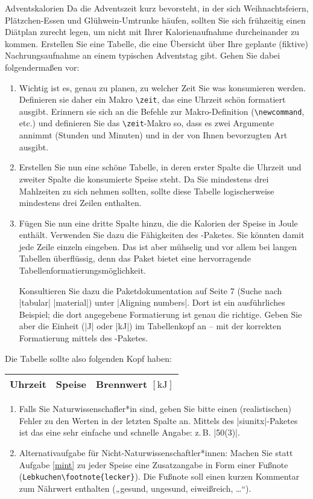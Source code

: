 \documentclass[
	vorläufig=true, 
	blattnr=4,
	ausgabe=2017-11-17,
	abgabe=2017-11-24,
	lösung=false,
	shortverb,
]{../tex/latexkurs-exercise}
\begin{document}
\begin{aufgabe}[12]{Adventskalorien}
		Da die Adventszeit kurz bevorsteht, in der sich Weihnachtsfeiern, Plätzchen-Essen und Glühwein-Umtrunke häufen, sollten Sie sich frühzeitig einen Diätplan zurecht legen, um nicht mit Ihrer Kalorienaufnahme durcheinander zu kommen. Erstellen Sie eine Tabelle, die eine Übersicht über Ihre geplante (fiktive) Nachrungsaufnahme an einem typischen Adventstag gibt. Gehen Sie dabei folgendermaßen vor:
	\begin{enumerate}[label=\alph*)]
		\item Wichtig ist es, genau zu planen, zu welcher Zeit Sie was konsumieren werden. Definieren sie daher ein Makro \texttt{\textbackslash zeit}, das eine Uhrzeit schön formatiert ausgibt. Erinnern sie sich an die Befehle zur Makro-Definition (\texttt{\textbackslash newcommand}, etc.) und definieren Sie das \texttt{\textbackslash zeit}-Makro so, dass es zwei Argumente annimmt (Stunden und Minuten) und in der von Ihnen bevorzugten Art ausgibt.
		\item Erstellen Sie nun eine schöne Tabelle, in deren erster Spalte die Uhrzeit und zweiter Spalte die konsumierte Speise steht. Da Sie mindestens drei Mahlzeiten zu sich nehmen sollten, sollte diese Tabelle logischerweise mindestens drei Zeilen enthalten.
		\item Fügen Sie nun eine dritte Spalte hinzu, die die Kalorien der Speise in Joule enthält. Verwenden Sie dazu die Fähigkeiten des -Paketes. Sie könnten damit jede Zeile einzeln eingeben. Das ist aber mühselig und vor allem bei langen Tabellen überflüssig, denn das Paket bietet eine hervorragende Tabellenformatierungsmöglichkeit.

Konsultieren Sie dazu die Paketdokumentation auf Seite 7 (Suche nach |tabular| |material|) unter |Aligning numbers|. Dort ist ein ausführliches Beispiel; die dort angegebene Formatierung ist genau die richtige. Geben Sie aber die Einheit (|J| oder |kJ|) im Tabellenkopf an – mit der korrekten Formatierung mittels des -Paketes.
	\end{enumerate}
	Die Tabelle sollte also folgenden Kopf haben:
	\begin{table}[h]
		\centering
		\begin{tabular}{lll}
			\toprule
			Uhrzeit & Speise & Brennwert $[\mathrm{kJ}]$\\
			\midrule
		\end{tabular}
	\end{table}
	\begin{enumerate}[resume, label=\alph*)]
		\item \label{mint} Falls Sie Naturwissenschafler*in sind, geben Sie bitte einen (realistischen) Fehler zu den Werten in der letzten Spalte an. Mittels des |siunitx|-Paketes ist das eine sehr einfache und schnelle Angabe: z.\,B. |50(3)|.
		\item Alternativaufgabe für Nicht-Naturwissenschaftler*innen: Machen Sie statt Aufgabe \ref{mint} zu jeder Speise eine Zusatzangabe in Form einer Fußnote (\texttt{Lebkuchen\textbackslash footnote\{lecker\}}). Die Fußnote soll einen kurzen Kommentar zum Nährwert enthalten („gesund, ungesund, eiweißreich, …“).
		

\end{enumerate}
\end{aufgabe}
\end{document}

